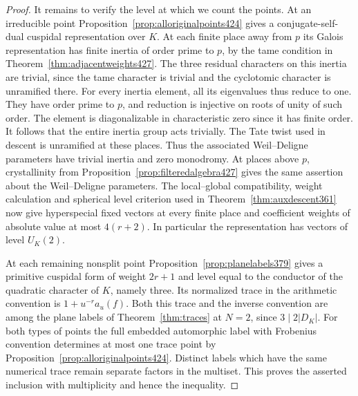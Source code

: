 \documentclass[a4paper,11pt]{article}
\theoremstyle{definition}
\theoremstyle{remark}
\numberwithin{equation}{section}
\begin{document}
\begin{proof}
It remains to verify the level at which we count the points.
At an irreducible point Proposition~\ref{prop:alloriginalpoints424}
gives a conjugate-self-dual cuspidal representation over \(K\).
At each finite place away from \(p\) its Galois representation
has finite inertia of order prime to \(p\), by the tame condition
in Theorem~\ref{thm:adjacentweights427}. The three residual
characters on this inertia are trivial, since the tame character
is trivial and the cyclotomic character is unramified there.
For every inertia element, all its eigenvalues thus reduce to one.
They have order prime to \(p\), and reduction is injective on
roots of unity of such order. The element is diagonalizable
in characteristic zero since it has finite order. It follows
that the entire inertia group acts trivially. The Tate twist
used in descent is unramified at these places. Thus the associated
Weil--Deligne parameters have trivial inertia and zero monodromy.
At places above \(p\), crystallinity from
Proposition~\ref{prop:filteredalgebra427} gives the same assertion
about the Weil--Deligne parameters. The local--global compatibility,
weight calculation and spherical level criterion used in
Theorem~\ref{thm:auxdescent361} now give hyperspecial fixed
vectors at every finite place and coefficient weights of absolute
value at most \(4(r+2)\). In particular the representation has
vectors of level \(U_K(2)\).

At each remaining nonsplit point
Proposition~\ref{prop:planelabels379} gives a primitive cuspidal
form of weight \(2r+1\) and level equal to the conductor of
the quadratic character of \(K\), namely three. Its normalized
trace in the arithmetic convention is \(1+u^{-r}a_u(f)\).
Both this trace and the inverse convention are among the plane
labels of Theorem~\ref{thm:traces} at \(N=2\), since \(3\mid 2|D_K|\).
For both types of points the full embedded automorphic label with
Frobenius convention determines at most one trace point by
Proposition~\ref{prop:alloriginalpoints424}. Distinct labels
which have the same numerical trace remain separate factors
in the multiset. This proves the asserted inclusion with
multiplicity and hence the inequality.
\end{proof}
\end{document}

